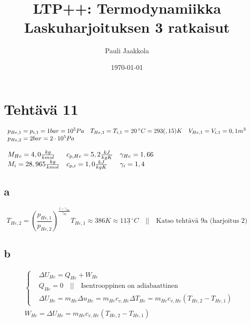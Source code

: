 \documentclass[12pt,a4paper,finnish]{article}
\title{LTP++: Termodynamiikka\\Laskuharjoituksen 3 ratkaisut}
\date{\today}
\author{Pauli Jaakkola}
\begin{document}
\maketitle
\tableofcontents
\newpage

\section{Tehtävä 11}

\begin{math}
 \begin{array}{l l l}
  p_{He, 1} = p_{i, 1} = 1 bar = 10^5 Pa & T_{He, 1} = T_{i, 1} = 20\,^{\circ}C = 293(,15) K & V_{He, 1} = V_{i, 1} = 0,1m^3\\
  p_{He, 2} = 2 bar = 2\cdot10^5 Pa & & \\
 \end{array}
\end{math}

\begin{math}
 \begin{array}{l l l}
  M_{He} = 4,0 \frac{kg}{kmol} & c_{p, He} = 5,2 \frac{kJ}{kgK} & \gamma_{He} = 1,66\\
  M_{i} = 28,965 \frac{kg}{kmol} & c_{p, i} = 1,0 \frac{kJ}{kgK} & \gamma_{i} = 1,4\\
 \end{array}
\end{math}

\subsection{a}

\begin{equation}
 T_{He, 2} = \left(\frac{p_{He, 1}}{p_{He, 2}}\right)^{\frac{1 - \gamma_{He}}{\gamma_{He}}}T_{He, 1} \approx 386 K \approx \underline{113\,^{\circ}C}
  \quad \bigg|\bigg| \quad \text{Katso tehtävä 9a (harjoitus 2)}
\end{equation}

\subsection{b}

\begin{align}
 &\left\{
  \begin{aligned}
  &\Delta U_{He} = Q_{He} + W_{He}\\
  &Q_{He} = 0\quad \bigg|\bigg| \quad \text{Isentrooppinen on adiabaattinen}\\
  &\Delta U_{He} = m_{He}\Delta u_{He} = m_{He}c_{v, He}\Delta T_{He} = m_{He}c_{v, He}(T_{He, 2} - T_{He, 1})
  \end{aligned}\right.\\
 &W_{He} = \Delta U_{He} = m_{He}c_{v, He}(T_{He, 2} - T_{He, 1})
\end{align}
\end{document}
